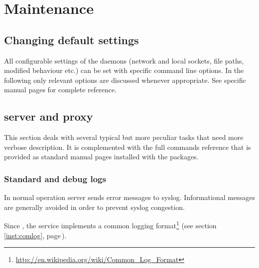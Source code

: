 %
%
\section{Maintenance}

\subsection{Changing default settings}
All configurable settings of the \LB daemons (network and local sockets, 
file paths, modified behaviour etc.) can be set with specific command line
options.
In the following only relevant options are discussed whenever appropriate.
See specific manual pages for complete reference.

\subsection{\LB server and proxy}

This section deals with several typical but more peculiar tasks
that need more verbose description.
It is complemented with the full commands reference that is provided
as standard manual pages installed with the \LB packages.

\subsubsection{Standard and debug logs}

In normal operation \LB server sends error messages to syslog.
Informational messages are generally avoided in order to prevent syslog congestion.

Since , the service implements a common logging format\footnote{\url{http://en.wikipedia.org/wiki/Common_Log_Format}} (see section\,\ref{inst:comlog}, page\,\pageref{inst:comlog}).

